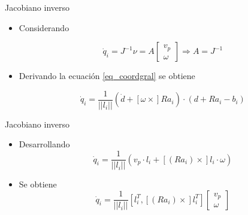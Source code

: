 \documentclass{beamer}
\begin{document}
\begin{frame}{Jacobiano inverso}
\begin{itemize}
 \item Considerando
 
 \begin{equation}
\dot{q}_i=J^{-1} \nu = A \begin{bmatrix}
v_p\\
\omega
\end{bmatrix} \Rightarrow A = J^{-1}
\end{equation}

\item Derivando la ecuación \ref{eq_coordgral} se obtiene

\begin{equation}
\dot{q}_i=\frac{1}{||l_i||}(\dot{d} + [\omega \times] Ra_i)\cdot(d + Ra_i -b_i) 
\end{equation}

\end{itemize}

 
\end{frame}

\begin{frame}{Jacobiano inverso}

\begin{itemize}
 \item Desarrollando
 \begin{equation}
\dot{q}_i = \frac{1}{||l_i||} \left( v_p  \cdot l_i + [(Ra_i)\times]l_i \cdot \omega \right )
\end{equation}
 \item Se obtiene
\begin{equation} 
\label{eq: inverse jacobian}
\dot{q}_i = \frac{1}{||l_i||} [l_i^T , [(Ra_i)\times]l_i^T] \begin{bmatrix}
v_p\\
\omega
\end{bmatrix}
\end{equation}
 
\end{itemize}



\end{frame}
\end{document}
